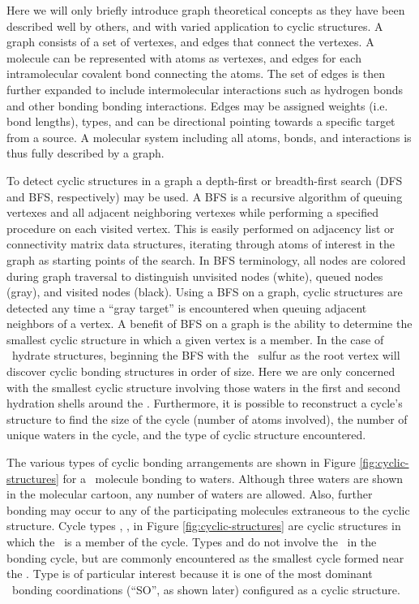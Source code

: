 Here we will only briefly introduce graph theoretical concepts as they have been described well by others, and with varied application to cyclic structures.\cite{Tutte1984, Balakrishnan2000, Harary1973, Huber2007, Garcia2004, Dury2001} A graph consists of a set of vertexes, and edges that connect the vertexes. A molecule can be represented with atoms as vertexes, and edges for each intramolecular covalent bond connecting the atoms. The set of edges is then further expanded to include intermolecular interactions such as hydrogen bonds and other bonding bonding interactions. Edges may be assigned weights (i.e. bond lengths), types, and can be directional pointing towards a specific target from a source. A molecular system including all atoms, bonds, and interactions is thus fully described by a graph. 

To detect cyclic structures in a graph a depth-first or breadth-first search (DFS and BFS, respectively) may be used.\cite{Knuth1997, Cormen 2001} A BFS is a recursive algorithm of queuing vertexes and all adjacent neighboring vertexes while performing a specified procedure on each visited vertex. This is easily performed on adjacency list or connectivity matrix data structures, iterating through atoms of interest in the graph as starting points of the search. In BFS terminology, all nodes are colored during graph traversal to distinguish unvisited nodes (white), queued nodes (gray), and visited nodes (black). Using a BFS on a graph, cyclic structures are detected any time a ``gray target'' is encountered when queuing adjacent neighbors of a vertex. A benefit of BFS on a graph is the ability to determine the smallest cyclic structure in which a given vertex is a member. In the case of \suldiox~hydrate structures, beginning the BFS with the \suldiox~sulfur as the root vertex will discover cyclic bonding structures in order of size. Here we are only concerned with the smallest cyclic structure involving those waters in the first and second hydration shells around the \suldiox. Furthermore, it is possible to reconstruct a cycle's structure to find the size of the cycle (number of atoms involved), the number of unique waters in the cycle, and the type of cyclic structure encountered.

The various types of cyclic bonding arrangements are shown in Figure \ref{fig:cyclic-structures} for a \suldiox~molecule bonding to waters. Although three waters are shown in the molecular cartoon, any number of waters are allowed. Also, further bonding may occur to any of the participating molecules extraneous to the cyclic structure. Cycle types , ,  in Figure \ref{fig:cyclic-structures} are cyclic structures in which the \suldiox~is a member of the cycle. Types  and  do not involve the \suldiox~in the bonding cycle, but are commonly encountered as the smallest cycle formed near the \suldiox. Type  is of particular interest because it is one of the most dominant \suldiox~bonding coordinations (``SO'', as shown later) configured as a cyclic structure. 


